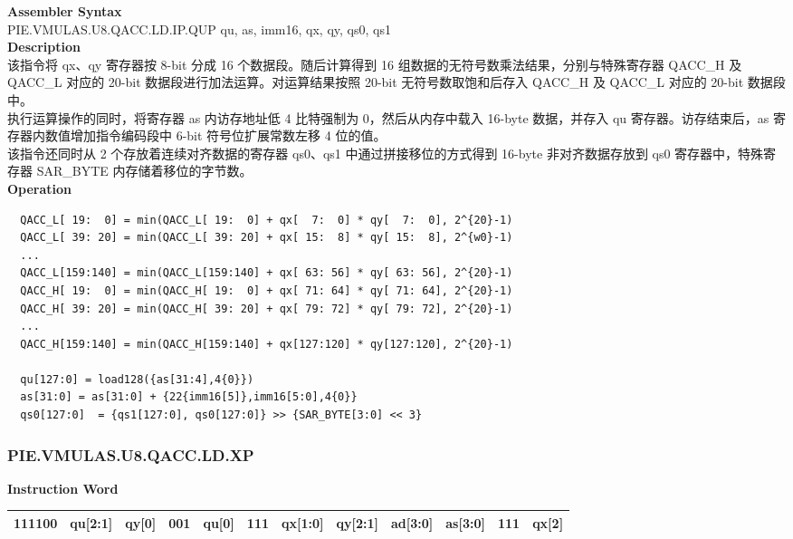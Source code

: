 \textbf{Assembler Syntax} \\
PIE.VMULAS.U8.QACC.LD.IP.QUP qu, as, imm16, qx, qy, qs0, qs1 \\
\textbf{Description} \\
该指令将 qx、qy 寄存器按 8-bit 分成 16 个数据段。随后计算得到 16 组数据的无符号数乘法结果，分别与特殊寄存器 QACC\_H 及 QACC\_L 对应的 20-bit 数据段进行加法运算。对运算结果按照 20-bit 无符号数取饱和后存入 QACC\_H 及 QACC\_L 对应的 20-bit 数据段中。\\
执行运算操作的同时，将寄存器 as 内访存地址低 4 比特强制为 0，然后从内存中载入 16-byte 数据，并存入 qu 寄存器。访存结束后，as 寄存器内数值增加指令编码段中 6-bit 符号位扩展常数左移 4 位的值。\\
该指令还同时从 2 个存放着连续对齐数据的寄存器 qs0、qs1 中通过拼接移位的方式得到 16-byte 非对齐数据存放到 qs0 寄存器中，特殊寄存器 SAR\_BYTE 内存储着移位的字节数。\\
\textbf{Operation}
\begin{lstlisting}
  QACC_L[ 19:  0] = min(QACC_L[ 19:  0] + qx[  7:  0] * qy[  7:  0], 2^{20}-1)
  QACC_L[ 39: 20] = min(QACC_L[ 39: 20] + qx[ 15:  8] * qy[ 15:  8], 2^{w0}-1)
  ...
  QACC_L[159:140] = min(QACC_L[159:140] + qx[ 63: 56] * qy[ 63: 56], 2^{20}-1)
  QACC_H[ 19:  0] = min(QACC_H[ 19:  0] + qx[ 71: 64] * qy[ 71: 64], 2^{20}-1)
  QACC_H[ 39: 20] = min(QACC_H[ 39: 20] + qx[ 79: 72] * qy[ 79: 72], 2^{20}-1)
  ...
  QACC_H[159:140] = min(QACC_H[159:140] + qx[127:120] * qy[127:120], 2^{20}-1)

  qu[127:0] = load128({as[31:4],4{0}})
  as[31:0] = as[31:0] + {22{imm16[5]},imm16[5:0],4{0}}
  qs0[127:0]  = {qs1[127:0], qs0[127:0]} >> {SAR_BYTE[3:0] << 3}
\end{lstlisting}

\newpage
\subsubsection{PIE.VMULAS.U8.QACC.LD.XP}\label{instruction:PIEVMULASU8QACCLDXP}
\setlength\tabcolsep{6pt}
\textbf{Instruction Word} \\
\begin{tabular}{|c|c|c|c|c|c|c|c|c|c|c|c|}
	\hline
	111100 & qu[2:1] & qy[0] & 001 & qu[0] & 111 & qx[1:0] & qy[2:1] & ad[3:0] & as[3:0] & 111 & qx[2] \\
	\hline
\end{tabular}

